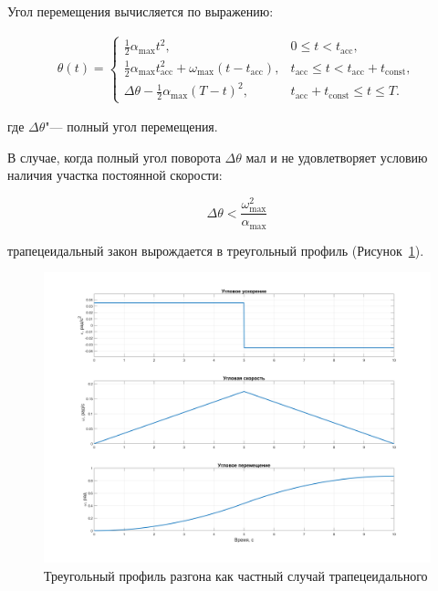 Угол перемещения вычисляется по выражению:

\begin{equation}
	\begin{split}
		\label{eq:theta_function}
		\theta(t) =
		\begin{cases}
			\frac{1}{2}\alpha_{\max} t^{2}, & 0 \leq t < t_{\mathrm{acc}},\\[6pt]
			\frac{1}{2}\alpha_{\max} t_{\mathrm{acc}}^{2} + \omega_{\max}(t - t_{\mathrm{acc}}), 
			& t_{\mathrm{acc}} \leq t < t_{\mathrm{acc}} + t_{\mathrm{const}},\\[6pt]
			\Delta\theta - \frac{1}{2}\alpha_{\max}(T - t)^{2}, 
			& t_{\mathrm{acc}} + t_{\mathrm{const}} \leq t \leq T.
		\end{cases}
	\end{split}
\end{equation}

где \(\Delta \theta\)"--- полный угол перемещения.


В случае, когда полный угол поворота $\Delta \theta$ мал и не удовлетворяет условию наличия участка постоянной скорости:

\begin{equation}
	\Delta \theta < \frac{\omega_{\max}^2}{\alpha_{\max}}
\end{equation}

трапецеидальный закон вырождается в треугольный профиль (Рисунок~\cref{fig:triangle_profile}). 

\begin{figure}[h!]
	\centering
	\includegraphics[scale=0.3]{matlab/img/triangle-profile.png}
	\caption{Треугольный профиль разгона как частный случай трапецеидального}
	\label{fig:triangle_profile}
\end{figure}

